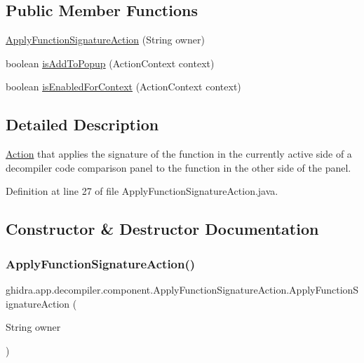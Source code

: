 \subsection*{Public Member Functions}
\begin{DoxyCompactItemize}
\item 
\mbox{\hyperlink{classghidra_1_1app_1_1decompiler_1_1component_1_1_apply_function_signature_action_ad3bce5f99b167afd1aeaf97feaf28e0b}{Apply\+Function\+Signature\+Action}} (String owner)
\item 
boolean \mbox{\hyperlink{classghidra_1_1app_1_1decompiler_1_1component_1_1_apply_function_signature_action_ab62369648637f2e2148b58346914ba74}{is\+Add\+To\+Popup}} (Action\+Context context)
\item 
boolean \mbox{\hyperlink{classghidra_1_1app_1_1decompiler_1_1component_1_1_apply_function_signature_action_ac0deeaae0f5d80371c729dd0192fbee1}{is\+Enabled\+For\+Context}} (Action\+Context context)
\end{DoxyCompactItemize}


\subsection{Detailed Description}
\mbox{\hyperlink{class_action}{Action}} that applies the signature of the function in the currently active side of a decompiler code comparison panel to the function in the other side of the panel. 

Definition at line 27 of file Apply\+Function\+Signature\+Action.\+java.



\subsection{Constructor \& Destructor Documentation}
\mbox{\label{classghidra_1_1app_1_1decompiler_1_1component_1_1_apply_function_signature_action_ad3bce5f99b167afd1aeaf97feaf28e0b}} 
\subsubsection{\texorpdfstring{ApplyFunctionSignatureAction()}{ApplyFunctionSignatureAction()}}
{\footnotesize\ttfamily ghidra.\+app.\+decompiler.\+component.\+Apply\+Function\+Signature\+Action.\+Apply\+Function\+Signature\+Action (\begin{DoxyParamCaption}\item[{String}]{owner }\end{DoxyParamCaption})\hspace{0.3cm}{\ttfamily [inline]}}

